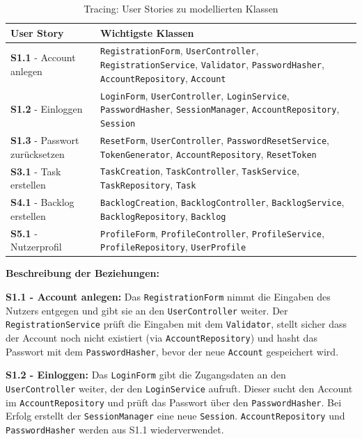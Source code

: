 \documentclass[a4paper,11pt]{article}
\begin{document}
\begin{table}[h]
\centering
\small
\renewcommand{\arraystretch}{1.4}
\begin{tabular}{| p{3.5cm} | p{10cm} |}
\hline
\textbf{User Story} & \textbf{Wichtigste Klassen} \\
\hline
\textbf{S1.1} - Account anlegen &
\texttt{RegistrationForm}, \texttt{UserController}, \texttt{RegistrationService}, \texttt{Validator}, \texttt{PasswordHasher}, \texttt{AccountRepository}, \texttt{Account} \\
\hline
\textbf{S1.2} - Einloggen &
\texttt{LoginForm}, \texttt{UserController}, \texttt{LoginService}, \texttt{PasswordHasher}, \texttt{SessionManager}, \texttt{AccountRepository}, \texttt{Session} \\
\hline
\textbf{S1.3} - Passwort zurücksetzen &
\texttt{ResetForm}, \texttt{UserController}, \texttt{PasswordResetService}, \texttt{TokenGenerator}, \texttt{AccountRepository}, \texttt{ResetToken} \\
\hline
\textbf{S3.1} - Task erstellen &
\texttt{TaskCreation}, \texttt{TaskController}, \texttt{TaskService}, \texttt{TaskRepository}, \texttt{Task} \\
\hline
\textbf{S4.1} - Backlog erstellen &
\texttt{BacklogCreation}, \texttt{BacklogController}, \texttt{BacklogService}, \texttt{BacklogRepository}, \texttt{Backlog} \\
\hline
\textbf{S5.1} - Nutzerprofil &
\texttt{ProfileForm}, \texttt{ProfileController}, \texttt{ProfileService}, \texttt{ProfileRepository}, \texttt{UserProfile} \\
\hline
\end{tabular}
\caption{Tracing: User Stories zu modellierten Klassen}
\end{table}

\bigskip

\noindent\textbf{Beschreibung der Beziehungen:}

\textbf{S1.1 - Account anlegen:} Das \texttt{RegistrationForm} nimmt die Eingaben des Nutzers entgegen und gibt sie an den \texttt{UserController} weiter. Der \texttt{RegistrationService} prüft die Eingaben mit dem \texttt{Validator}, stellt sicher dass der Account noch nicht existiert (via \texttt{AccountRepository}) und hasht das Passwort mit dem \texttt{PasswordHasher}, bevor der neue \texttt{Account} gespeichert wird.

\textbf{S1.2 - Einloggen:} Das \texttt{LoginForm} gibt die Zugangsdaten an den \texttt{UserController} weiter, der den \texttt{LoginService} aufruft. Dieser sucht den Account im \texttt{AccountRepository} und prüft das Passwort über den \texttt{PasswordHasher}. Bei Erfolg erstellt der \texttt{SessionManager} eine neue \texttt{Session}. \texttt{AccountRepository} und \texttt{PasswordHasher} werden aus S1.1 wiederverwendet.
\end{document}
